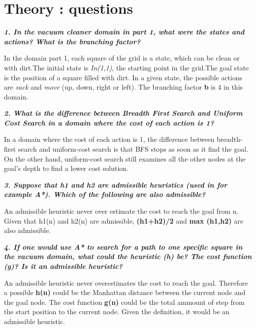 \section{Theory : questions \\ }

\textit{\textbf{1. In the vacuum cleaner domain in part 1, what were the states and actions? What is the branching factor?}}

In the domain part 1, each square of the grid is a state, which can be clean
or with dirt.The initial state is \textit{In(1,1)}, the starting point in
the grid.The goal state is the position of a square filled with dirt.
In a given state, the possible actions are \textit{suck} and \textit{move} (up,
down, right or left).
The branching factor \textbf{b} is 4 in this domain.

\textit{\textbf{2. What is the difference between Breadth First Search and Uniform Cost Search in a domain where the cost of each action is 1?}}


In a domain where the cost of each action is 1, the difference between
breadth-first search and uniform-cost search is that BFS stops as soon as it
find the goal. On the other hand, uniform-cost search still examines all the other
nodes at the goal's depth to find a lower cost solution.

\textit{\textbf{3. Suppose that h1 and h2 are admissible heuristics (used in for example A*). Which of the following are also admissible?}}

An admissible heuristic never over estimate the cost to reach the goal from n.
Given that h1(n) and h2(n) are admissible, \textbf{(h1+h2)/2} and \textbf{max (h1,h2)}
are also admissible.

\textit{\textbf{4. If one would use A* to search for a path to one specific square in the vacuum domain, what could the heuristic (h) be? The cost function (g)? Is it an admissible heuristic?}}

An admissible heuristic never overestimates the cost to reach the goal. Therefore
a possible \textbf{h(n)} could be the Manhattan distance between the current node
and the goal node. The cost function \textbf{g(n)} could be the total ammount of step
from the start position to the current node. Given the definition, it would be
an admissible heuristic.

